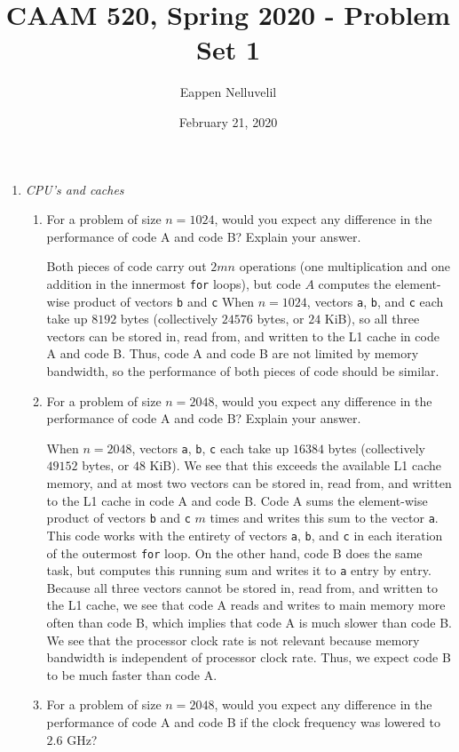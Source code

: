 \documentclass{article}
\title{CAAM 520, Spring 2020 - Problem Set 1}
\author{Eappen Nelluvelil}
\date{February 21, 2020}
\begin{document}
\maketitle

\begin{enumerate}
    \item \textit{CPU's and caches}
    \begin{enumerate}
        \item For a problem of size $n = 1024$, would you expect any difference in the performance of code A and code B?
        Explain your answer.
        \par 
        Both pieces of code carry out $2mn$ operations (one multiplication and one addition in the innermost \verb|for| loops), but code $A$ computes the element-wise product of vectors \verb|b| and \verb|c|
        When $n = 1024$, vectors \verb|a|, \verb|b|, and \verb|c| each take up $8192$ bytes (collectively $24576$ bytes, or $24$ KiB), so all three vectors can be stored in, read from, and written to the L1 cache in code A and code B.
        Thus, code A and code B are not limited by memory bandwidth, so the performance of both pieces of code should be similar.
        \item For a problem of size $n = 2048$, would you expect any difference in the performance of code A and code B?
        Explain your answer.
        \par 
        When $n = 2048$, vectors \verb|a|, \verb|b|, \verb|c| each take up $16384$ bytes (collectively $49152$ bytes, or $48$ KiB).
        We see that this exceeds the available L1 cache memory, and at most two vectors can be stored in, read from, and written to the L1 cache in code A and code B.
        Code A sums the element-wise product of vectors \verb|b| and \verb|c| $m$ times and writes this sum to the vector \verb|a|.
        This code works with the entirety of vectors \verb|a|, \verb|b|, and \verb|c| in each iteration of the outermost \verb|for| loop.
        On the other hand, code B does the same task, but computes this running sum and writes it to \verb|a| entry by entry.
        Because all three vectors cannot be stored in, read from, and written to the L1 cache, we see that code A reads and writes to main memory more often than code B, which implies that code A is much slower than code B.
        We see that the processor clock rate is not relevant because memory bandwidth is independent of processor clock rate.
        Thus, we expect code B to be much faster than code A.
        \item For a problem of size $n = 2048$, would you expect any difference in the performance of code A and code B if the clock frequency was lowered to $2.6$ GHz?

\end{enumerate}
\end{enumerate}
\end{document}
